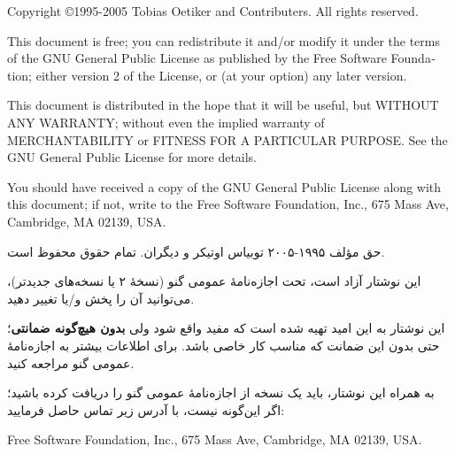 \pagebreak
\thispagestyle{empty}
\begin{small}
\begin{latin} 
  Copyright \copyright 1995-2005 Tobias Oetiker and Contributers.  All rights reserved.
 
  This document is free; you can redistribute it and/or modify it
  under the terms of the GNU General Public License as published by
  the Free Software Foundation; either version 2 of the License, or
  (at your option) any later version.
  
  This document is distributed in the hope that it will be useful, but
  WITHOUT ANY WARRANTY; without even the implied warranty of
  MERCHANTABILITY or FITNESS FOR A PARTICULAR PURPOSE\@.  See the GNU
  General Public License for more details.
  
  You should have received a copy of the GNU General Public License
  along with this document; if not, write to the Free Software
  Foundation, Inc., 675 Mass Ave, Cambridge, MA 02139, USA.

\end{latin}

\medskip 
حق مؤلف ۱۹۹۵-۲۰۰۵ \lr{\copyright} توبیاس اوتیکر و دیگران. تمام حقوق محفوظ است.

این نوشتار آزاد است، تحت اجازه‌نامهٔ عمومی گنو (نسخهٔ ۲ یا نسخه‌های جدیدتر)، می‌توانید آن را پخش و/یا تغییر دهید.

این نوشتار به این امید تهیه شده است که مفید واقع شود ولی \textbf{بدون هیچ‌گونه ضمانتی}؛ حتی بدون این ضمانت که مناسب کار خاصی باشد. برای اطلاعات بیشتر به اجازه‌نامهٔ عمومی گنو مراجعه کنید.

به همراه این نوشتار، باید یک نسخه از اجازه‌نامهٔ عمومی گنو را دریافت کرده باشید؛ اگر این‌گونه نیست، با آدرس زیر تماس حاصل فرمایید:

\begin{latin}
 Free Software   Foundation, Inc., 675 Mass Ave, Cambridge, MA 02139, USA.
\end{latin}

\end{small}

\endinput

%

